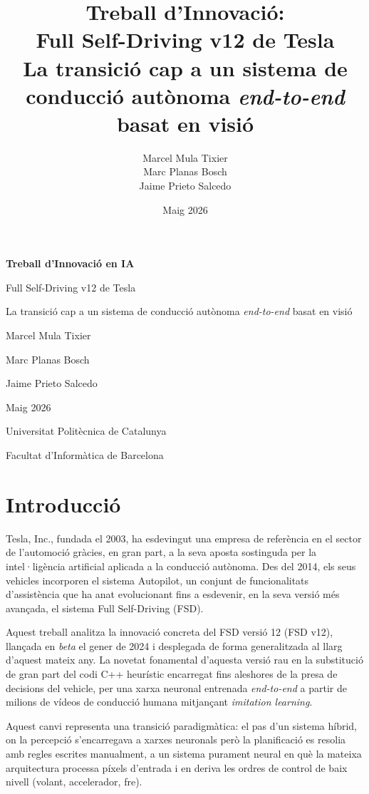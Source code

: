 \documentclass[11pt,a4paper]{article}
\title{Treball d'Innovació:\\
Full Self-Driving v12 de Tesla\\
\large{La transició cap a un sistema de conducció autònoma \emph{end-to-end} basat en visió}}
\author{Marcel Mula Tixier \\ Marc Planas Bosch \\ Jaime Prieto Salcedo}
\date{Maig 2026}
\begin{document}
\begin{titlepage}
\centering
\vspace*{2cm}
{\Huge\bfseries Treball d'Innovació en IA\par}
\vspace{1cm}
{\LARGE Full Self-Driving v12 de Tesla\par}
\vspace{0.5cm}
{\large La transició cap a un sistema de conducció autònoma \emph{end-to-end} basat en visió\par}
\vspace{2.5cm}
{\large Marcel Mula Tixier\par}
{\large Marc Planas Bosch\par}
{\large Jaime Prieto Salcedo\par}
\vspace{2.5cm}
{\large Maig 2026\par}
\vfill
{\large Universitat Politècnica de Catalunya\par}
{\large Facultat d'Informàtica de Barcelona\par}
\end{titlepage}

\tableofcontents
\newpage

\section{Introducció}

Tesla, Inc., fundada el 2003, ha esdevingut una empresa de referència en el sector de l'automoció gràcies, en gran part, a la seva aposta sostinguda per la intel·ligència artificial aplicada a la conducció autònoma. Des del 2014, els seus vehicles incorporen el sistema Autopilot, un conjunt de funcionalitats d'assistència que ha anat evolucionant fins a esdevenir, en la seva versió més avançada, el sistema Full Self-Driving (FSD).

Aquest treball analitza la innovació concreta del FSD versió 12 (FSD v12), llançada en \emph{beta} el gener de 2024 i desplegada de forma generalitzada al llarg d'aquest mateix any. La novetat fonamental d'aquesta versió rau en la substitució de gran part del codi C++ heurístic encarregat fins aleshores de la presa de decisions del vehicle, per una xarxa neuronal entrenada \emph{end-to-end} a partir de milions de vídeos de conducció humana mitjançant \emph{imitation learning}.

Aquest canvi representa una transició paradigmàtica: el pas d'un sistema híbrid, on la percepció s'encarregava a xarxes neuronals però la planificació es resolia amb regles escrites manualment, a un sistema purament neural en què la mateixa arquitectura processa píxels d'entrada i en deriva les ordres de control de baix nivell (volant, accelerador, fre).
\end{document}

